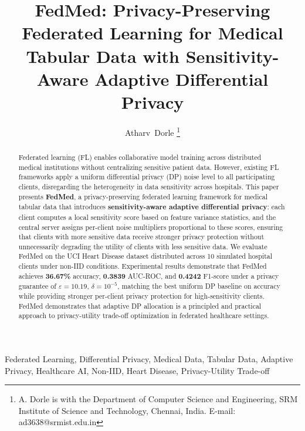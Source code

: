 \documentclass[journal]{IEEEtran}
\begin{document}
\title{FedMed: Privacy-Preserving Federated Learning for Medical Tabular Data
with Sensitivity-Aware Adaptive Differential Privacy}

\author{Atharv~Dorle%
  \thanks{A. Dorle is with the Department of Computer Science and Engineering,
  SRM Institute of Science and Technology, Chennai, India.
  E-mail: ad3638@srmist.edu.in}
}

\maketitle

\begin{abstract}
Federated learning (FL) enables collaborative model training across distributed
medical institutions without centralizing sensitive patient data. However,
existing FL frameworks apply a uniform differential privacy (DP) noise level
to all participating clients, disregarding the heterogeneity in data sensitivity
across hospitals. This paper presents \textbf{FedMed}, a privacy-preserving
federated learning framework for medical tabular data that introduces
\textbf{sensitivity-aware adaptive differential privacy}: each client computes
a local sensitivity score based on feature variance statistics, and the central
server assigns per-client noise multipliers proportional to these scores,
ensuring that clients with more sensitive data receive stronger privacy
protection without unnecessarily degrading the utility of clients with less
sensitive data. We evaluate FedMed on the UCI Heart Disease dataset distributed
across 10 simulated hospital clients under non-IID conditions. Experimental
results demonstrate that FedMed achieves \textbf{36.67\%} accuracy,
\textbf{0.3839} AUC-ROC, and \textbf{0.4242} F1-score under a privacy
guarantee of $\varepsilon{=}10.19$, $\delta{=}10^{-5}$, matching the best
uniform DP baseline on accuracy while providing stronger per-client privacy
protection for high-sensitivity clients. FedMed demonstrates that adaptive
DP allocation is a principled and practical approach to privacy-utility
trade-off optimization in federated healthcare settings.
\end{abstract}

\begin{IEEEkeywords}
Federated Learning, Differential Privacy, Medical Data, Tabular Data,
Adaptive Privacy, Healthcare AI, Non-IID, Heart Disease, Privacy-Utility
Trade-off
\end{IEEEkeywords}
\end{document}
